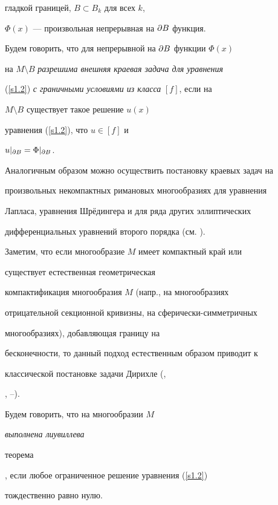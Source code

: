 гладкой границей, $B\subset B_k$ для всех $k$,


$\Phi(x)$ --- произвольная непрерывная на $\partial{B}$ функция. 





Будем говорить, что для непрерывной на $\partial{B}$ функции $\Phi(x)$


на $M\setminus B$ {\it разрешима внешняя краевая задача для уравнения}


(\ref{s1.2}) {\it с граничными условиями из класса} $[f]$, если на


$M\setminus B$ существует такое решение $u(x)$ 


уравнения (\ref{s1.2}), что $u\in[f]$ и


$u|_{\partial{B}}=\Phi|_{\partial{B}}$.





Аналогичным образом можно осуществить постановку краевых задач на


произвольных некомпактных римановых многообразиях для уравнения


Лапласа, уравнения Шр\"едингера и для ряда других эллиптических


дифференциальных уравнений второго порядка (см. \cite{Maz}).





Заметим, что если многообразие $M$ имеет компактный край или 


существует естественная геометрическая 


компактификация многообразия $M$ (напр., на многообразиях


отрицательной секционной кривизны, на сферически-симметричных


многообразиях), добавляющая границу на


бесконечности, то данный подход естественным образом приводит к


классической постановке задачи Дирихле (\cite{Lan1},


\cite{Lan2}, \cite{L1}--\cite{An}). 





Будем говорить, что на многообразии $M$ {\it выполнена лиувиллева


теорема}, если любое ограниченное решение уравнения (\ref{s1.2})


тождественно равно нулю.






